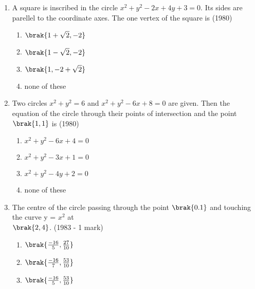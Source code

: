 \begin{enumerate}
\hfill{}
\begin{enumerate}
\end{enumerate}
    \item A square is inscribed in the circle $x^{2} + y^{2} - 2x +4y +3= 0.$ Its sides are parellel to the coordinate axes. The one vertex of the square is \hfill {(1980)}
    \begin{multicols}{2}
    	\begin{enumerate}
    		\item $\brak{1+\sqrt{2}, -2}$ 
    		\item $\brak{1-\sqrt{2}, -2}$
    		\item $\brak{1, -2 +\sqrt{2}}$
    		\item none of these
    	\end{enumerate}
    \end{multicols}
    \item Two circles $x^{2} + y^{2} = 6$ and $x^{2} + y^{2}-6x +8=0$ are given. Then the equation of the circle through their points of intersection and the point $\brak{1,1}$ is \hfill {(1980)}
    \begin{enumerate}
    	\item $x^{2}+y^{2}-6x+4=0$ 
    	\item $x^{2}+y^{2}-3x+1=0$
    	\item $x^{2}+y^{2}-4y+2=0$
    	\item none of these
    \end{enumerate}
    \item The centre of the circle passing through the point $\brak{0.1}$ and touching the curve y = $x^{2}$ at \\ $\brak{2,4}$.
    \hfill {(1983 - 1 mark)}
    \begin{multicols}{2}
    	\begin{enumerate}
    		\item $\brak{\frac{-16}{5},\frac{27}{10}}$
    		\item $\brak{\frac{-16}{7},\frac{53}{10}}$
    		\item $\brak{\frac{-16}{5},\frac{53}{10}}$

\end{enumerate}
\end{multicols}
\end{enumerate}
